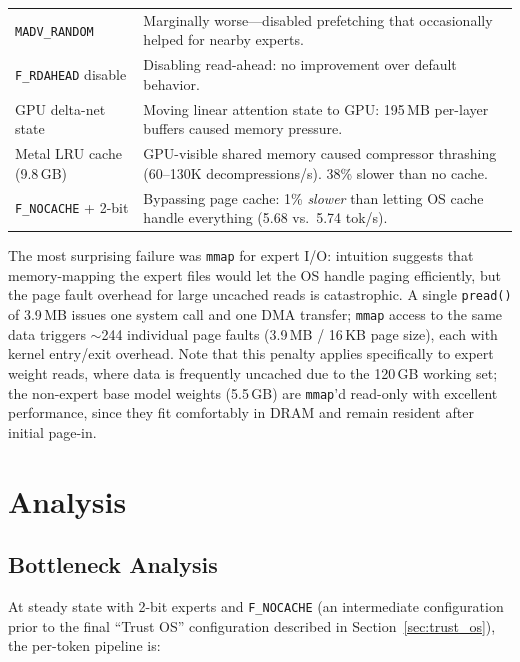 \documentclass[11pt,twocolumn]{article}
\begin{document}
\begin{table}[t]
\begin{tabular}{@{}p{2.2cm}p{4.3cm}@{}}
\addlinespace
\texttt{MADV\_RANDOM} & Marginally worse---disabled prefetching that occasionally helped for nearby experts. \\
\addlinespace
\texttt{F\_RDAHEAD} disable & Disabling read-ahead: no improvement over default behavior. \\
\addlinespace
GPU delta-net state & Moving linear attention state to GPU: 195\,MB per-layer buffers caused memory pressure. \\
\addlinespace
Metal LRU cache (9.8\,GB) & GPU-visible shared memory caused compressor thrashing (60--130K decompressions/s). 38\% slower than no cache. \\
\addlinespace
\texttt{F\_NOCACHE} + 2-bit & Bypassing page cache: 1\% \emph{slower} than letting OS cache handle everything (5.68 vs.\ 5.74 tok/s). \\
\bottomrule
\end{tabular}
\end{table}

The most surprising failure was \texttt{mmap} for expert I/O: intuition suggests that memory-mapping the expert files would let the OS handle paging efficiently, but the page fault overhead for large uncached reads is catastrophic.
A single \texttt{pread()} of 3.9\,MB issues one system call and one DMA transfer; \texttt{mmap} access to the same data triggers $\sim$244 individual page faults (3.9\,MB / 16\,KB page size), each with kernel entry/exit overhead.
Note that this penalty applies specifically to expert weight reads, where data is frequently uncached due to the 120\,GB working set; the non-expert base model weights (5.5\,GB) are \texttt{mmap}'d read-only with excellent performance, since they fit comfortably in DRAM and remain resident after initial page-in.

\section{Analysis}

\subsection{Bottleneck Analysis}

At steady state with 2-bit experts and \texttt{F\_NOCACHE} (an intermediate configuration prior to the final ``Trust OS'' configuration described in Section~\ref{sec:trust_os}), the per-token pipeline is:
\end{document}
